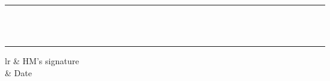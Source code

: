 \documentclass[12pt]{article}
\begin{document}
\begin{longtable}{|l|p{3.5cm}|p{3.5cm}|p{3.5cm}|l|p{1.5cm}|l|l|l|l|l|l|l|l|l|l|l|l|l|l|l|l|l|l|l|l|l|l|l|l|l|l|l|l|l|l|l|l|}
\rule{0cm}{0.75cm} & \relax & \relax & \relax & \relax & \relax & \relax & & & & & & & & & & & & & & & & & & & & & & & & & & & & & & &\\ \hline
\rule{0cm}{0.75cm} & \relax & \relax & \relax & \relax & \relax & \relax & & & & & & & & & & & & & & & & & & & & & & & & & & & & & & &\\ \hline
\rule{0cm}{0.75cm} & \relax & \relax & \relax & \relax & \relax & \relax & & & & & & & & & & & & & & & & & & & & & & & & & & & & & & &\\ \hline
\rule{0cm}{0.75cm} & \relax & \relax & \relax & \relax & \relax & \relax & & & & & & & & & & & & & & & & & & & & & & & & & & & & & & &\\ \hline
\rule{0cm}{0.75cm} & \relax & \relax & \relax & \relax & \relax & \relax & & & & & & & & & & & & & & & & & & & & & & & & & & & & & & &\\ \hline
\rule{0cm}{0.75cm} & \relax & \relax & \relax & \relax & \relax & \relax & & & & & & & & & & & & & & & & & & & & & & & & & & & & & & &\\ \hline
\rule{0cm}{0.75cm} & \relax & \relax & \relax & \relax & \relax & \relax & & & & & & & & & & & & & & & & & & & & & & & & & & & & & & &\\ \hline
\rule{0cm}{0.75cm} & \relax & \relax & \relax & \relax & \relax & \relax & & & & & & & & & & & & & & & & & & & & & & & & & & & & & & &\\ \hline
\rule{0cm}{0.75cm} & \relax & \relax & \relax & \relax & \relax & \relax & & & & & & & & & & & & & & & & & & & & & & & & & & & & & & &\\ \hline
\rule{0cm}{0.75cm} & \relax & \relax & \relax & \relax & \relax & \relax & & & & & & & & & & & & & & & & & & & & & & & & & & & & & & &\\ \hline
\rule{0cm}{0.75cm} & \relax & \relax & \relax & \relax & \relax & \relax & & & & & & & & & & & & & & & & & & & & & & & & & & & & & & &\\ \hline
\rule{0cm}{0.75cm} & \relax & \relax & \relax & \relax & \relax & \relax & & & & & & & & & & & & & & & & & & & & & & & & & & & & & & &\\ \hline
\rule{0cm}{0.75cm} & \relax & \relax & \relax & \relax & \relax & \relax & & & & & & & & & & & & & & & & & & & & & & & & & & & & & & &\\ \hline
\rule{0cm}{0.75cm} & \relax & \relax & \relax & \relax & \relax & \relax & & & & & & & & & & & & & & & & & & & & & & & & & & & & & & &\\ \hline
\end{longtable}



    \begin{tabular}{lr}
     & HM's signature \\
    & Date \\
    \end{tabular}
  
\end{document}
